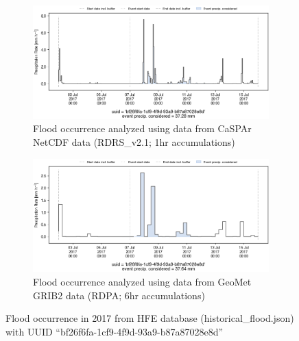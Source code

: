 \documentclass[10pt,a4paper,titlepage,parskip]{scrartcl}
\begin{document}
\begin{figure}[h]
	\begin{subfigure}[a]{1.0\textwidth}
		\centering
		\includegraphics[width=\linewidth]{figures/compare_Geomet_CaSPAr/interpolated_at_stations_occurrence_1362_identified-timesteps_RDRS_v2.1.png}
		\caption{Flood occurrence analyzed using data from CaSPAr NetCDF data (RDRS\_v2.1; 1hr accumulations)}
	\end{subfigure}
	\par\bigskip\bigskip
	\begin{subfigure}[b]{1.0\textwidth}
		\centering
		\includegraphics[width=\linewidth]{figures/compare_Geomet_CaSPAr/interpolated_at_stations_occurrence_1362_identified-timesteps_rdpa_10km_6f.png}
		\caption{Flood occurrence analyzed using data from GeoMet GRIB2 data (RDPA; 6hr accumulations)}
	\end{subfigure}
	\par\bigskip\bigskip
	\caption{Flood occurrence in 2017 from HFE database (historical\_flood.json) with UUID ``bf26f6fa-1cf9-4f9d-93a9-b87a87028e8d''}
\end{figure}
\pagebreak
\end{document}
